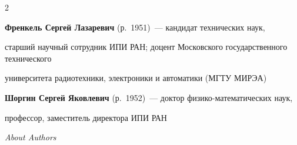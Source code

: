 \begin{multicols}{2}
\vspace*{4pt}



\noindent

\textbf{Френкель Сергей Лазаревич} (р.\ 1951)~--- кандидат технических наук,

старший научный сотрудник ИПИ РАН; доцент Московского государственного технического

университета радиотехники, электроники и автоматики (МГТУ МИРЭА)



\vspace*{4pt}



\noindent

\textbf{Шоргин Сергей Яковлевич} (р.\ 1952)~--- доктор фи\-зи\-ко-ма\-те\-ма\-ти\-че\-ских наук,

профессор, заместитель директора ИПИ РАН



\def\leftfootline{\small{\textbf{\thepage}

\hfill ИНФОРМАТИКА И ЕЁ ПРИМЕНЕНИЯ\ \ \ том~6\ \ \ выпуск~4\ \ \ 2012}

}%

 \def\rightfootline{\small{ИНФОРМАТИКА И ЕЁ ПРИМЕНЕНИЯ\ \ \ том~6\ \ \ выпуск~4\ \ \ 2012

\hfill \textbf{\thepage}}}





\end{multicols}





\vspace*{24pt}

\begin{center}\LARGE

\textit{About Authors}

\end{center}




\def\tit{\ }



\def\aut{\ }



\def\auf{\ }





\def\leftkol{ABOUT AUTHORS}



